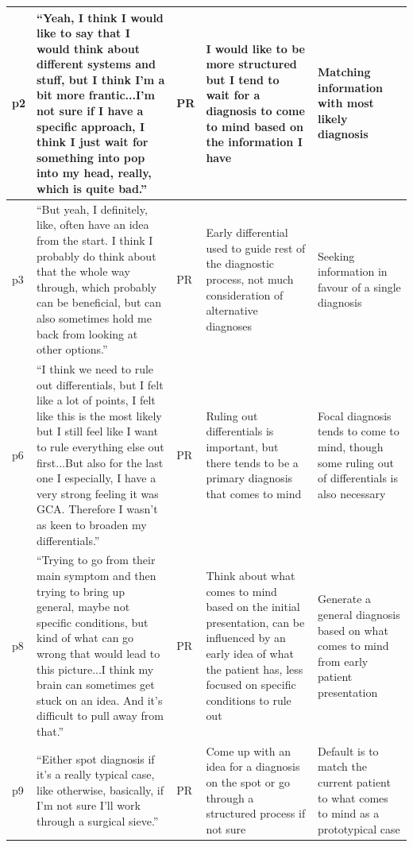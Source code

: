\documentclass[a4paper, nobind]{templates/ociamthesis}
\begin{document}
\begin{longtable}[t]{>{\raggedright\arraybackslash}p{5em}|>{\raggedright\arraybackslash}p{14em}|>{\raggedright\arraybackslash}p{3em}|>{\raggedright\arraybackslash}p{6em}|>{\raggedright\arraybackslash}p{6em}}
\hline
p2 & “Yeah, I think I would like to say that I would think about different systems and stuff, but I think I'm a bit more frantic...I'm not sure if I have a specific approach, I think I just wait for something into pop into my head, really, which is quite bad.” & PR & I would like to be more structured but I tend to wait for a diagnosis to come to mind based on the information I have & Matching information with most likely diagnosis\\
\hline
p3 & “But yeah, I definitely, like, often have an idea from the start. I think I probably do think about that the whole way through, which probably can be beneficial, but can also sometimes hold me back from looking at other options.” & PR & Early differential used to guide rest of the diagnostic process, not much consideration of alternative diagnoses & Seeking information in favour of a single diagnosis\\
\hline
p6 & “I think we need to rule out differentials, but I felt like a lot of points, I felt like this is the most likely but I still feel like I want to rule everything else out first...But also for the last one I especially, I have a very strong feeling it was GCA. Therefore I wasn't as keen to broaden my differentials.” & PR & Ruling out differentials is important, but there tends to be a primary diagnosis that comes to mind & Focal diagnosis tends to come to mind, though some ruling out of differentials is also necessary\\
\hline
p8 & “Trying to go from their main symptom and then trying to bring up general, maybe not specific conditions, but kind of what can go wrong that would lead to this picture...I think my brain can sometimes get stuck on an idea. And it's difficult to pull away from that.” & PR & Think about what comes to mind based on the initial presentation, can be influenced by an early idea of what the patient has, less focused on specific conditions to rule out & Generate a general diagnosis based on what comes to mind from early patient presentation\\
\hline
p9 & “Either spot diagnosis if it's a really typical case, like otherwise, basically, if I'm not sure I'll work through a surgical sieve.” & PR & Come up with an idea for a diagnosis on the spot or go through a structured process if not sure & Default is to match the current patient to what comes to mind as a prototypical case\\
\hline

\end{longtable}
\end{document}
